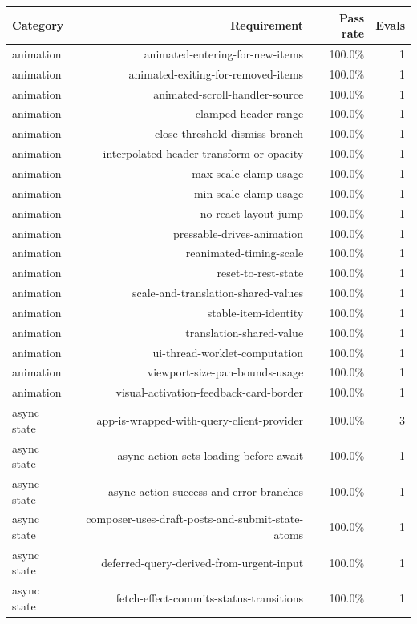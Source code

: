 \begin{table}[htbp]
\centering
\begin{tabular}{lrrr}
\toprule
Category & Requirement & Pass rate & Evals \\
\midrule
animation & animated-entering-for-new-items & 100.0\% & 1 \\
animation & animated-exiting-for-removed-items & 100.0\% & 1 \\
animation & animated-scroll-handler-source & 100.0\% & 1 \\
animation & clamped-header-range & 100.0\% & 1 \\
animation & close-threshold-dismiss-branch & 100.0\% & 1 \\
animation & interpolated-header-transform-or-opacity & 100.0\% & 1 \\
animation & max-scale-clamp-usage & 100.0\% & 1 \\
animation & min-scale-clamp-usage & 100.0\% & 1 \\
animation & no-react-layout-jump & 100.0\% & 1 \\
animation & pressable-drives-animation & 100.0\% & 1 \\
animation & reanimated-timing-scale & 100.0\% & 1 \\
animation & reset-to-rest-state & 100.0\% & 1 \\
animation & scale-and-translation-shared-values & 100.0\% & 1 \\
animation & stable-item-identity & 100.0\% & 1 \\
animation & translation-shared-value & 100.0\% & 1 \\
animation & ui-thread-worklet-computation & 100.0\% & 1 \\
animation & viewport-size-pan-bounds-usage & 100.0\% & 1 \\
animation & visual-activation-feedback-card-border & 100.0\% & 1 \\
async state & app-is-wrapped-with-query-client-provider & 100.0\% & 3 \\
async state & async-action-sets-loading-before-await & 100.0\% & 1 \\
async state & async-action-success-and-error-branches & 100.0\% & 1 \\
async state & composer-uses-draft-posts-and-submit-state-atoms & 100.0\% & 1 \\
async state & deferred-query-derived-from-urgent-input & 100.0\% & 1 \\
async state & fetch-effect-commits-status-transitions & 100.0\% & 1 \\

\end{tabular}
\end{table}
